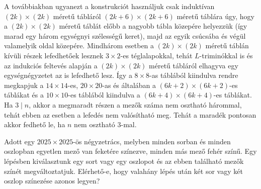 \begin{solution}
\begin{enumerate}
A továbbiakban ugyanezt a konstrukciót használjuk csak induktívan $(2k) \times (2k)$ méretű tábláról $(2k+6)\times (2k+6)$ méretű táblára úgy, hogy a $(2k) \times (2k)$ méretű táblát előbb a nagyobb tábla közepére helyezzük (így marad egy három egységnyi szélességű keret), majd az egyik csúcsába és végül valamelyik oldal közepére. Mindhárom esetben a $(2k) \times (2k)$ méretű táblán kívüli részek lefedhetőek lesznek $3\times 2$-es téglalapokkal, tehát $L$-triminókkal is és az indukciós feltevés alapján a $(2k) \times (2k)$ méretű tábláról elhagyva egy egységnégyzetet az is lefedhető lesz. Így a $8\times 8$-as táblából kiindulva rendre megkapjuk a $14\times 14$-es, $20\times 20$-as és általában a $(6k+2)\times (6k+2)$-es táblákat és a $10\times 10$-es táblából kiindulva a $(6k+4)\times (6k+4)$-es táblákat. Ha \(3\mid n\), akkor a megmaradt részen a mezők száma nem osztható hárommal, tehát ebben az esetben a lefedés nem valósítható meg.  Tehát a maradék pontosan akkor fedhető le, ha \(n\) nem osztható \(3\)-mal. 
\end{enumerate}
\end{solution}
\begin{problem}
 Adott egy \(2025 \times 2025\)-ös négyzetrács, melyben minden sorban és minden oszlopban egyetlen mező van feketére színezve, minden más mező fehér színű. Egy lépésben kiválasztunk egy sort vagy egy oszlopot és  az ebben található mezők színét megváltoztatjuk.
 Elérhető-e, hogy valahány lépés után két sor vagy két oszlop színezése azonos legyen?
\end{problem}

